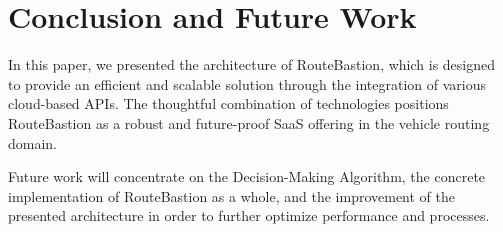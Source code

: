 \section{Conclusion and Future Work}
\label{sec:conclusion}


In this paper, we presented the architecture of RouteBastion, which is designed to provide an efficient and scalable solution through the integration of various cloud-based APIs. The thoughtful combination of technologies positions RouteBastion as a robust and future-proof SaaS offering in the vehicle routing domain.

Future work will concentrate on the Decision-Making Algorithm, the concrete implementation of RouteBastion as a whole, and the improvement of the presented architecture in order to further optimize performance and processes.
